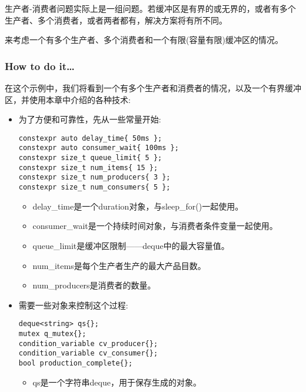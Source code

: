 
生产者-消费者问题实际上是一组问题。若缓冲区是有界的或无界的，或者有多个生产者、多个消费者，或者两者都有，解决方案将有所不同。

来考虑一个有多个生产者、多个消费者和一个有限(容量有限)缓冲区的情况。

\subsubsection{How to do it…}

在这个示例中，我们将看到一个有多个生产者和消费者的情况，以及一个有界缓冲区，并使用本章中介绍的各种技术:

\begin{itemize}
\item 
为了方便和可靠性，先从一些常量开始:

\begin{lstlisting}[style=styleCXX]
constexpr auto delay_time{ 50ms };
constexpr auto consumer_wait{ 100ms };
constexpr size_t queue_limit{ 5 };
constexpr size_t num_items{ 15 };
constexpr size_t num_producers{ 3 };
constexpr size_t num_consumers{ 5 };
\end{lstlisting}

\begin{itemize}
\item
delay\_time是一个duration对象，与sleep\_for()一起使用。

\item 
consumer\_wait是一个持续时间对象，与消费者条件变量一起使用。

\item 
queue\_limit是缓冲区限制——deque中的最大容量值。

\item 
num\_items是每个生产者生产的最大产品目数。

\item 
num\_producers是消费者的数量。
\end{itemize}

\item 
需要一些对象来控制这个过程:

\begin{lstlisting}[style=styleCXX]
deque<string> qs{};
mutex q_mutex{};
condition_variable cv_producer{};
condition_variable cv_consumer{};
bool production_complete{};
\end{lstlisting}

\begin{itemize}
\item 
qs是一个字符串deque，用于保存生成的对象。


\end{itemize}
\end{itemize}
